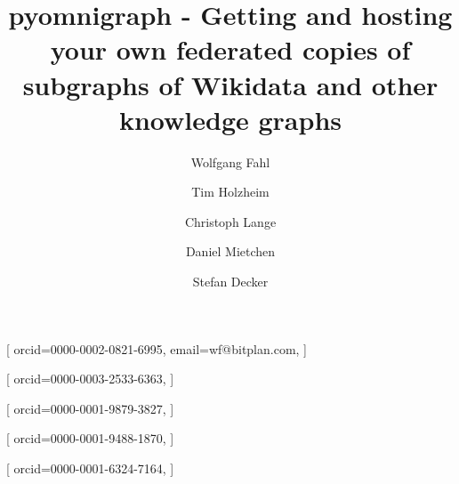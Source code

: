 \documentclass[
]{ceurart}
\begin{document}


\title{pyomnigraph - Getting and hosting your own federated copies of subgraphs of Wikidata and other knowledge graphs}
\tnotemark[1]

\author[1,3]{Wolfgang Fahl}[%
orcid=0000-0002-0821-6995,
email=wf@bitplan.com,
]
\cormark[1]
\author[1]{Tim Holzheim}[%
orcid=0000-0003-2533-6363,
]
\author[2]{Christoph Lange}[%
orcid=0000-0001-9879-3827,
]
\author[4,5,6]{Daniel Mietchen}[%
orcid=0000-0001-9488-1870,
]
\author[1]{Stefan Decker}[%
orcid=0000-0001-6324-7164,
]


\address[1]{RWTH Aachen University, Computer Science i5, Aachen, Germany}
\address[2]{Fraunhofer FIT, Sankt Augustin, Germany}
\address[3]{BITPlan GmbH, Willich, Germany}
\address[4]{FIZ Karlsruhe -- Leibniz Institute for Information Infrastructure, Karlsruhe, Germany}
\address[5]{Leibniz Institute of Freshwater Ecology and Inland Fisheries (IGB), Berlin, Germany}
\address[6]{Institute for Globally Distributed Open Research and Education (IGDORE), Jena, Germany}

\end{document}
